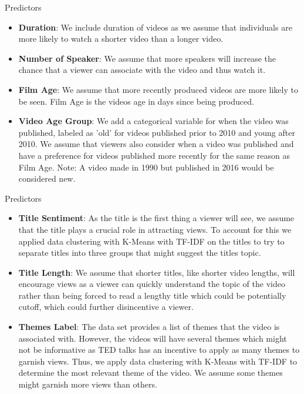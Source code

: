 \begin{frame}{Predictors}
\begin{itemize}
	\item \textbf{Duration}: We include duration of videos as we assume that individuals are more likely to watch a shorter video than a longer video.
	\item \textbf{Number of Speaker}: We assume that more speakers will increase the chance that a viewer can associate with the video and thus watch it. 
	\item \textbf{Film Age}: We assume that more recently produced videos are more likely to be seen. Film Age is the videos age in days since being produced.
	\item \textbf{Video Age Group}: We add a categorical variable for when the video was published, labeled as 'old' for videos published prior to 2010 and young after 2010.  We assume that viewers also consider when a video was published and have a preference for videos published more recently for the same reason as Film Age. Note: A video made in 1990 but published in 2016 would be considered new.
\end{itemize}
\end{frame}
\begin{frame}{Predictors}
	\begin{itemize}
		\item \textbf{Title Sentiment}: As the title is the first thing a viewer will see, we assume that the title plays a crucial role in attracting views. To account for this we applied data clustering with K-Means with TF-IDF on the titles to try to separate titles into three groups that might suggest the titles topic.
		\item \textbf{Title Length}: We assume that shorter titles, like shorter video lengths, will encourage views as a viewer can quickly understand the topic of the video rather than being forced to read a lengthy title which could be potentially cutoff, which could further disincentive a viewer.
		\item \textbf{Themes Label}: The data set provides a list of themes that the video is associated with. However, the videos will have several themes which might not be informative as TED talks has an incentive to apply as many themes to garnish views. Thus, we apply data clustering with K-Means with TF-IDF to determine the most relevant theme of the video. We assume some themes might garnish more views than others. 
	\end{itemize}
\end{frame}

\begin{frame}{}
	
\end{frame}


